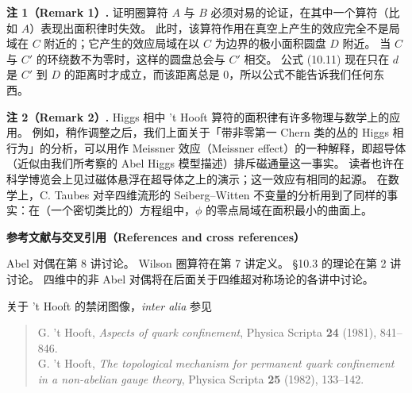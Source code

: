 
\textbf{注 1（Remark 1）.}
证明圈算符 $A$ 与 $B$ 必须对易的论证，在其中一个算符（比如 $A$）表现出面积律时失效。
此时，该算符作用在真空上产生的效应完全不是局域在 $C$ 附近的；它产生的效应局域在以 $C$ 为边界的极小面积圆盘 $D$ 附近。
当 $C$ 与 $C'$ 的环绕数不为零时，这样的圆盘总会与 $C'$ 相交。
公式 (10.11) 现在只在 $d$ 是 $C'$ 到 $D$ 的距离时才成立，而该距离总是 0，所以公式不能告诉我们任何东西。

\textbf{注 2（Remark 2）.}
Higgs 相中 't Hooft 算符的面积律有许多物理与数学上的应用。
例如，稍作调整之后，我们上面关于「带非零第一 Chern 类的丛的 Higgs 相行为」的分析，可以用作 Meissner 效应（Meissner effect）的一种解释，即超导体（近似由我们所考察的 Abel Higgs 模型描述）排斥磁通量这一事实。
读者也许在科学博览会上见过磁体悬浮在超导体之上的演示；这一效应有相同的起源。
在数学上，C. Taubes 对辛四维流形的 Seiberg–Witten 不变量的分析用到了同样的事实：在（一个密切类比的）方程组中，$\phi$ 的零点局域在面积最小的曲面上。

\textbf{参考文献与交叉引用（References and cross references）}

Abel 对偶在第 8 讲讨论。
Wilson 圈算符在第 7 讲定义。
§10.3 的理论在第 2 讲讨论。
四维中的非 Abel 对偶将在后面关于四维超对称场论的各讲中讨论。

关于 't Hooft 的禁闭图像，\textit{inter alia} 参见
\begin{quote}
G. 't Hooft, \textit{Aspects of quark confinement}, Physica Scripta \textbf{24} (1981), 841--846.\\
G. 't Hooft, \textit{The topological mechanism for permanent quark confinement in a non-abelian gauge theory}, Physica Scripta \textbf{25} (1982), 133--142.
\end{quote}
